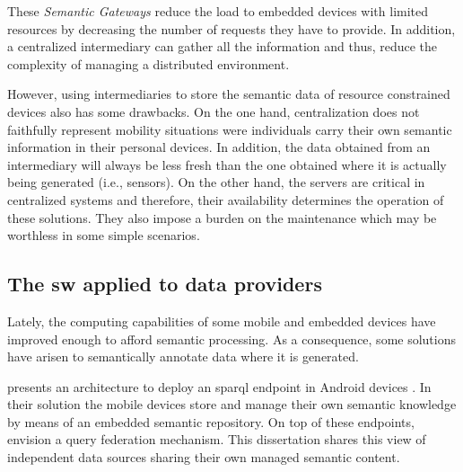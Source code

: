 These \emph{Semantic Gateways} reduce the load to embedded devices with limited resources by decreasing the number of requests they have to provide.
In addition, a centralized intermediary can gather all the information and thus, reduce the complexity of managing a distributed environment.

However, using intermediaries to store the semantic data of resource constrained devices also has some drawbacks.
On the one hand, centralization does not faithfully represent mobility situations were individuals carry their own semantic information in their personal devices.
In addition, the data obtained from an intermediary will always be less fresh than the one obtained where it is actually being generated (i.e., sensors).
On the other hand, the servers are critical in centralized systems and therefore, their availability determines the operation of these solutions.
They also impose a burden on the maintenance which may be worthless in some simple scenarios.



\subsection{The \acl{sw} applied to data providers}
\label{sec:sw_providers}

Lately, the computing capabilities of some mobile and embedded devices have improved enough to afford semantic processing. %
As a consequence, some solutions have arisen to semantically annotate data where it is generated. %


\citet{daquin_enabling_2011} presents an architecture to deploy an \acs{sparql}  endpoint in Android devices .
In their solution the mobile devices store and manage their own semantic knowledge by means of an embedded semantic repository.
On top of these endpoints, \citeauthor{daquin_enabling_2011} envision a query federation mechanism.
This dissertation shares this view of independent data sources sharing their own managed semantic content. %


